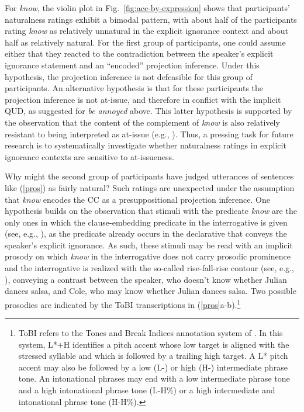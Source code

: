 \documentclass[11pt,fleqn]{article}
\newcommand{\6}{\mbox{$[\hspace*{-.6mm}[$}}
\newcommand{\9}{\mbox{$]\hspace*{-.6mm}]$}}
\begin{document}
For \emph{know}, the violin plot in Fig.~\ref{fig:acc-by-expression} shows that participants' naturalness ratings exhibit a bimodal pattern, with about half of the participants rating \emph{know} as relatively unnatural in the explicit ignorance context and about half as relatively natural. For the first group of participants, one could assume either that they reacted to the contradiction between the speaker's explicit ignorance statement and an ``encoded'' projection inference. Under this hypothesis, the projection inference is not defeasible for this group of participants. An alternative hypothesis is that for these participants the projection inference is not at-issue, and therefore in conflict with the implicit QUD, as suggested for \emph{be annoyed} above. This latter hypothesis is supported by the observation that the content of the complement of \emph{know} is also relatively resistant to being interpreted as at-issue (e.g., \citealt{simons07,tbd-variability,degen-tonhauser-glossa}). Thus, a pressing task for future research is to  systematically investigate whether naturalness ratings in explicit ignorance contexts are sensitive to at-issueness.

Why might the second group of participants have judged utterances of sentences like (\ref{pros}) as fairly natural? Such ratings are unexpected under the assumption that \emph{know} encodes the CC as a presuppositional projection inference. One hypothesis builds on the observation that stimuli with the predicate \emph{know} are the only ones in which the clause-embedding predicate in the interrogative is given (see, e.g., \citealt{schwarzschild99}), as the predicate already occurs in the declarative that conveys the speaker's explicit ignorance. As such, these stimuli may be read with an implicit prosody on which \emph{know} in the interrogative does not carry prosodic prominence and the interrogative is realized with the so-called rise-fall-rise contour (see, e.g., \citealt{ward-hirschberg85,buering97,buering03,wagner-etal2013}), conveying a contrast between the speaker, who doesn't know whether Julian dances salsa, and Cole, who may know whether Julian dances salsa. Two possible prosodies are indicated by the ToBI transcriptions in (\ref{pros}a-b).\footnote{ToBI refers to the Tones and Break Indices annotation system of \citealt{beckman-ayers97}. In this system, L*+H identifies a pitch accent whose low target is aligned with the stressed syllable and which is followed by a trailing high target. A L* pitch accent may also be followed by a low (L-) or high (H-) intermediate phrase tone. An intonational phrases may end with a low intermediate phrase tone and a high intonational phrase tone (L-H\%) or a high intermediate and intonational phrase tone (H-H\%).} 
\end{document}
